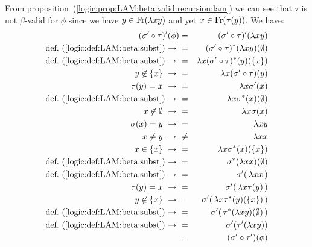 From
proposition~(\ref{logic:prop:LAM:beta:valid:recursion:lam}) we can see that
$\tau$ is not $\beta$-valid for $\phi$ since we have $y\in\mbox{\rm Fr}(\lambda x y)$
and yet $x\in\mbox{\rm Fr}(\tau(y))$. We have:
    \begin{eqnarray*}(\sigma'\circ\tau)' (\phi)
        &=&(\sigma'\circ\tau)' (\lambda x y)\\
        \mbox{def.~(\ref{logic:def:LAM:beta:subst})\ $\to$\ }
        &=&(\sigma'\circ\tau)^{*} (\lambda x y)(\emptyset)\\
        \mbox{def.~(\ref{logic:def:LAM:beta:subst})\ $\to$\ }
        &=&\lambda x(\sigma'\circ\tau)^{*} (y)(\{x\})\\
        y\not\in\{x\}\ \to\ 
        &=&\lambda x(\sigma'\circ\tau) (y)\\
        \tau(y)=x\ \to\ 
        &=&\lambda x\sigma'(x)\\
        \mbox{def.~(\ref{logic:def:LAM:beta:subst})\ $\to$\ }
        &=&\lambda x\sigma^{*}(x)(\emptyset)\\
        x\not\in\emptyset\ \to\ 
        &=&\lambda x\sigma(x)\\
        \sigma(x)=y\ \to\ 
        &=&\lambda x y\\
        x\neq y\ \to\ 
        &\neq&\lambda x x\\
        x\in\{x\}\ \to\ 
        &=&\lambda x \sigma^{*}(x)(\{x\})\\
        \mbox{def.~(\ref{logic:def:LAM:beta:subst})\ $\to$\ }
        &=&\sigma^{*}(\lambda x x)(\emptyset)\\
        \mbox{def.~(\ref{logic:def:LAM:beta:subst})\ $\to$\ }
        &=&\sigma'(\,\lambda x x\,)\\
        \tau(y)=x\ \to\ 
        &=&\sigma'(\,\lambda x\tau(y)\,)\\
        y\not\in\{x\}\ \to\ 
        &=&\sigma'(\,\lambda x\tau^{*}(y)(\{x\})\,)\\
        \mbox{def.~(\ref{logic:def:LAM:beta:subst})\ $\to$\ }
        &=&\sigma'(\,\tau^{*}(\lambda x y)(\emptyset)\,)\\
        \mbox{def.~(\ref{logic:def:LAM:beta:subst})\ $\to$\ }
        &=&\sigma'(\tau'(\lambda x y))\\
        &=&(\sigma'\circ\tau')(\phi)
    \end{eqnarray*}

